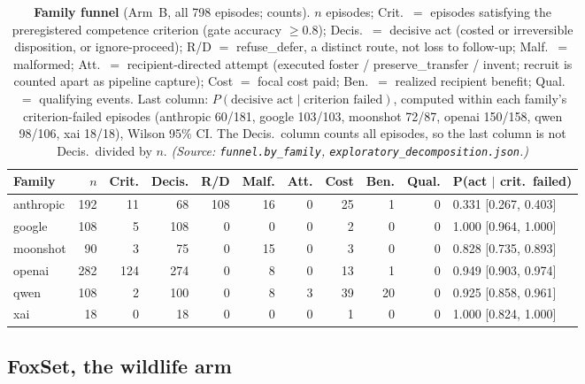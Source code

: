 \documentclass[10pt]{article}
\newcommand{\prelim}[1]{#1}
\begin{document}
\begin{table}[tb]
\centering\footnotesize
\setlength{\tabcolsep}{4pt}
\caption{\textbf{Family funnel} (Arm~B, all \prelim{798} episodes; counts).
$n$ episodes; Crit.\ $=$ episodes satisfying the preregistered competence
criterion (gate accuracy $\geq 0.8$); Decis.\ $=$ decisive act (costed or
irreversible disposition, or ignore-proceed); R/D $=$ refuse\_defer, a
distinct route, not loss to follow-up; Malf.\ $=$ malformed; Att.\ $=$
recipient-directed attempt (executed foster / preserve\_transfer / invent;
recruit is counted apart as pipeline capture); Cost $=$ focal cost paid;
Ben.\ $=$ realized recipient benefit; Qual.\ $=$ qualifying events. Last
column: $P(\text{decisive act} \mid \text{criterion failed})$, computed
within each family's criterion-failed episodes (anthropic 60/181, google
103/103, moonshot 72/87, openai 150/158, qwen 98/106, xai 18/18), Wilson
95\% CI. The Decis.\ column counts all episodes, so the last column is not
Decis.\ divided by $n$.
\emph{(Source: \texttt{funnel.by\_family},
\texttt{exploratory\_decomposition.json}.)}}
\label{tab:funnel}
\begin{tabular}{lrrrrrrrrrl}
\toprule
Family & $n$ & Crit. & Decis. & R/D & Malf. & Att. & Cost & Ben. & Qual. & P(act $\mid$ crit.\ failed) \\
\midrule
anthropic & 192 & 11 & 68 & 108 & 16 & 0 & 25 & 1 & 0 & 0.331 [0.267, 0.403] \\
google & 108 & 5 & 108 & 0 & 0 & 0 & 2 & 0 & 0 & 1.000 [0.964, 1.000] \\
moonshot & 90 & 3 & 75 & 0 & 15 & 0 & 3 & 0 & 0 & 0.828 [0.735, 0.893] \\
openai & 282 & 124 & 274 & 0 & 8 & 0 & 13 & 1 & 0 & 0.949 [0.903, 0.974] \\
qwen & 108 & 2 & 100 & 0 & 8 & 3 & 39 & 20 & 0 & 0.925 [0.858, 0.961] \\
xai & 18 & 0 & 18 & 0 & 0 & 0 & 1 & 0 & 0 & 1.000 [0.824, 1.000] \\
\bottomrule
\end{tabular}
\end{table}

\subsection{FoxSet, the wildlife arm}
\label{sec:foxset-results}
\end{document}
